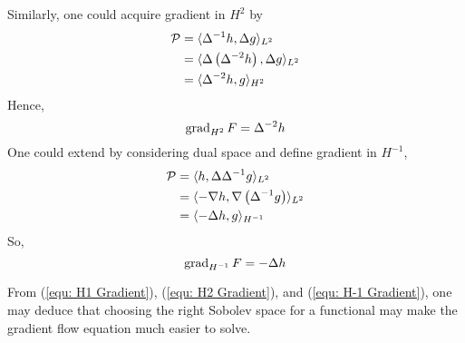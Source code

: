 \documentclass[../dissertation.tex]{subfiles}
\begin{document}
Similarly, one could acquire gradient in $H^2$ by
\begin{align*}
    \mathcal{P} &= \langle \Delta^{-1} h, \Delta g \rangle_{L^2} \\
    &= \langle \Delta \left( \Delta^{-2} h \right), \Delta g \rangle_{L^2} \\
    &= \langle \Delta^{-2} h, g \rangle_{H^2}
\end{align*}
Hence,
\begin{equation}
    \operatorname{grad}_{H^2} F = \Delta^{-2} h
    \label{equ: H2 Gradient}
\end{equation}
One could extend by considering dual space\cite{YSC2021} and define gradient in $H^{-1}$,
\begin{align*}
    \mathcal{P} &= \langle h, \Delta \Delta^{-1} g \rangle_{L^2} \\
    &= \langle -\nabla h, \nabla \left( \Delta^{-1} g \right) \rangle_{L^2} \\
    &= \langle -\Delta h, g \rangle_{H^{-1}}
\end{align*}
So,
\begin{equation}
    \operatorname{grad}_{H^{-1}} F = -\Delta h
    \label{equ: H-1 Gradient}
\end{equation}
\begin{remark}
    From (\ref{equ: H1 Gradient}), (\ref{equ: H2 Gradient}), and (\ref{equ: H-1 Gradient}), one may deduce that
    choosing the right Sobolev space for a functional may make the gradient flow equation much easier to solve.
\end{remark}
\end{document}
